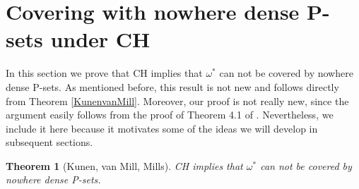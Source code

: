 \documentclass{article}%
\newtheorem{theorem}{Theorem}
\begin{document}
\section{Covering with nowhere dense P-sets under CH\textsf{\label{SeccionCH}%
}}

In this section we prove that \textsf{CH }implies that $\omega^{\ast}$ can not
be covered by nowhere dense \textsf{P}-sets. As mentioned before, this result
is not new and follows directly from Theorem \ref{KunenvanMill}. Moreover, our
proof is not really new, since the argument easily follows from the proof of
Theorem 4.1 of \cite{PFiltersCohenRandomLaver}. Nevertheless, we include it
here because it motivates some of the ideas we will develop in subsequent sections.

\begin{theorem}
[Kunen, van Mill, Mills]\textsf{CH }implies that $\omega^{\ast}$ can not be
covered by nowhere dense \textsf{P}-sets.
\end{theorem}
\end{document}
